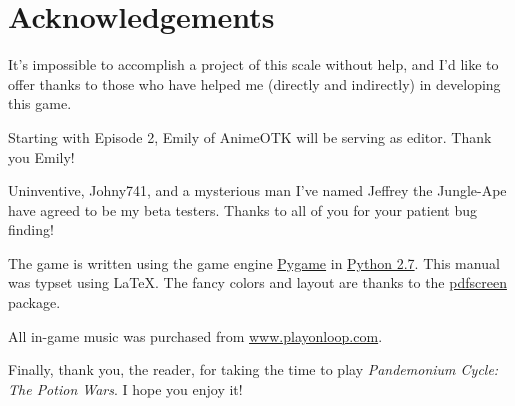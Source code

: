 \documentclass{report}
\begin{document}
\chapter{Acknowledgements}

It's impossible to accomplish a project of this scale without help, and I'd like to offer thanks to those who have helped me (directly and indirectly) in developing this game.


Starting with Episode 2, Emily of AnimeOTK will be serving as editor. Thank you Emily!

Uninventive, Johny741, and a mysterious man I've named Jeffrey the Jungle-Ape have agreed to be my beta testers. Thanks to all of you for your patient bug finding!

The game is written using the game engine \href{www.pygame.org}{Pygame} in \href{www.python.org}{Python 2.7}. This manual was typset using \LaTeX. The fancy colors and 
layout are thanks to the \href{texcatalogue.ctan.org/entries/pdfscreen.html}{pdfscreen} package.

All in-game music was purchased from \url{www.playonloop.com}.

Finally, thank you, the reader, for taking the time to play \textit{Pandemonium Cycle: The Potion Wars}. I hope you enjoy it! 
\end{document}
